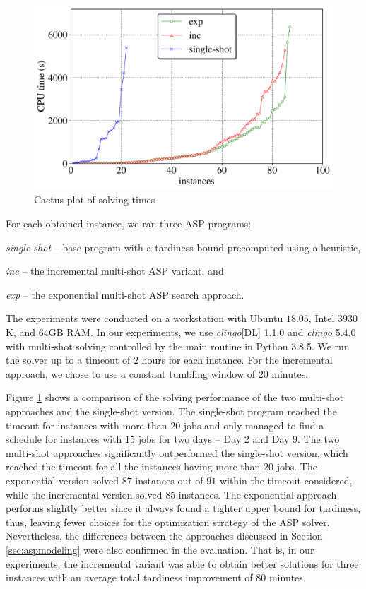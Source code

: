 \documentclass[submission,copyright,creativecommons]{eptcs}
\begin{document}
\begin{figure}[t]
	\centering
	\includegraphics[width=0.6\linewidth]{figures/cactus_time_font20.pdf}
	\caption{Cactus plot of solving times \label{fig:cactus:time}}
\end{figure}

For each obtained instance, we ran three ASP programs: 
\begin{enumerate*}[label=\emph{(\arabic*)}]	
	\item \emph{single-shot} -- base program with a tardiness bound precomputed using a heuristic,
	\item \emph{inc} -- the incremental multi-shot ASP variant, and 
	\item \emph{exp} -- the exponential multi-shot ASP search approach.
\end{enumerate*}
The experiments were conducted on a workstation with Ubuntu $18.05$, Intel  $3930$K, and $64$GB RAM. In our experiments, we use \emph{clingo}[DL] 1.1.0 and \emph{clingo} 5.4.0 with multi-shot solving controlled by the main routine in Python 3.8.5. We run the solver up to a timeout of $2$ hours for each instance. For the incremental approach, we chose to use a constant tumbling window of $20$ minutes.

Figure \ref{fig:cactus:time} shows a comparison of the solving performance of the two multi-shot approaches and the single-shot version. The single-shot program reached the timeout for instances with more than $20$ jobs and only managed to find a schedule for instances with $15$ jobs for two days -- Day 2 and Day 9.
%
The two multi-shot approaches significantly outperformed the single-shot version, which reached the timeout for all the instances having more than $20$ jobs. The exponential version solved $87$ instances out of $91$ within the timeout considered, while the incremental version solved $85$ instances. The exponential approach performs slightly better since it always found a tighter upper bound for tardiness, thus, leaving fewer choices for the optimization strategy of the ASP solver. Nevertheless, the differences between the approaches discussed in Section \ref{sec:aspmodeling} were also confirmed in the evaluation. That is, in our experiments, the incremental variant was able to obtain better solutions for three instances with an average total tardiness improvement of 80 minutes.
\end{document}
